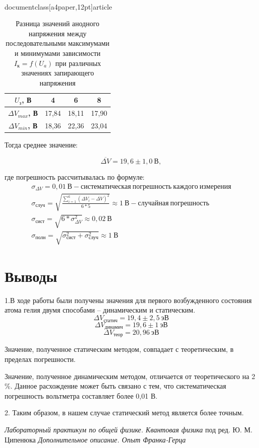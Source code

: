 \\documentclass[a4paper,12pt]{article}
\begin{document}
\begin{table}[h]
	\centering
	\caption{Разница значений анодного напряжения между последовательными максимумами и минимумами зависимости $I_к = f(U_a)$ при различных значениях запирающего напряжения}
	\label{table3}
	\begin{tabular}{|c|c|c|c|}
	\hline
	\textbf{$U_з$, В} & 4 & 6 & 8 \\ \hline
	\textbf{$\Delta V_{max}$, В} & 17,84 & 18,11 & 17,90 \\ \hline
	\textbf{$\Delta V_{min}$, В} & 18,36 & 22,36 & 23,04 \\ \hline
	\end{tabular}
\end{table}

Тогда среднее значение:

$$
	\overline {\Delta V} = 19,6 \pm 1,0 \ В,
$$

где погрешность рассчитывалась по формуле:
\begin{gather*}
	\sigma_{\Delta V} = 0,01 \ В - систематическая \ погрешность \ каждого \ измерения \\	
	\sigma_{случ} = \sqrt{\frac{\sum \limits_{i=1}^{6} (\Delta V_i - \overline {\Delta V})^2 }{6 * 5}} \approx 1 \ В - случайная \ погрешность \\
	\sigma_{сист} = \sqrt{6 * \sigma_{\Delta V}^2} \approx 0,02 \ В \\
	\sigma_{полн} = \sqrt{\sigma_{сист}^2 + \sigma_{случ}^2} \approx 1 \ В
\end{gather*}

\newpage

\section*{Выводы}

1.В ходе работы были получены значения для первого возбужденного состояния атома гелия двумя способами -- динамическим и статическим.
$$
	\Delta V_{статич} = 19,4 \pm 2,5 \ эВ 
$$
$$
	\Delta V_{динамич} = 19,6 \pm 1 \ эВ 
$$
$$
	\Delta V_{теор} = 20,96 \ эВ  
$$


Значение, полученное статическим методом, совпадает с теоретическим, в пределах погрешности. 

Значение, полученное динамическим методом, отличается от теоретического на 2 \%. Данное расхождение может быть связано с тем, что систематическая погрешность вольтметра составляет более 0,01 В.

2. Таким образом, в нашем случае статический метод является более точным.

\begin{thebibliography}{2}
	 \emph{Лабораторный практикум по общей физике. Квантовая физика} под ред. Ю. М. Ципенюка
	 \emph{Дополнительное описание. Опыт Франка-Герца}
\end{thebibliography}
\end{document}
